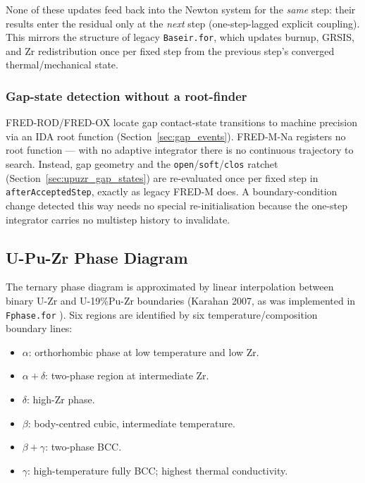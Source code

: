 \begin{refsection}
None of these updates feed back into the Newton system for the \emph{same} step: their results enter the residual only at the \emph{next} step (one-step-lagged explicit coupling).  This mirrors the structure of legacy \texttt{Baseir.for}, which updates burnup, GRSIS, and Zr redistribution once per fixed step from the previous step's converged thermal/mechanical state.

\subsubsection{Gap-state detection without a root-finder}

FRED-ROD/FRED-OX locate gap contact-state transitions to machine precision via an IDA root function (Section~\ref{sec:gap_events}).  FRED-M-Na registers no root function --- with no adaptive integrator there is no continuous trajectory to search.  Instead, gap geometry and the \texttt{open}/\texttt{soft}/\texttt{clos} ratchet (Section~\ref{sec:upuzr_gap_states}) are re-evaluated once per fixed step in \texttt{afterAcceptedStep}, exactly as legacy FRED-M does.  A boundary-condition change detected this way needs no special re-initialisation because the one-step integrator carries no multistep history to invalidate.

\subsection{U-Pu-Zr Phase Diagram}
\label{sec:phase}

The ternary phase diagram is approximated by linear interpolation between binary U-Zr and U-19\%Pu-Zr boundaries (Karahan 2007, as was implemented in \texttt{Fphase.for} \cite{karahan2009}).  Six regions are identified by six temperature/composition boundary lines:

\begin{itemize}
\item $\alpha$: orthorhombic phase at low temperature and low Zr.
\item $\alpha + \delta$: two-phase region at intermediate Zr.
\item $\delta$: high-Zr phase.
\item $\beta$: body-centred cubic, intermediate temperature.
\item $\beta + \gamma$: two-phase BCC.
\item $\gamma$: high-temperature fully BCC; highest thermal conductivity.
\end{itemize}


\end{refsection}
